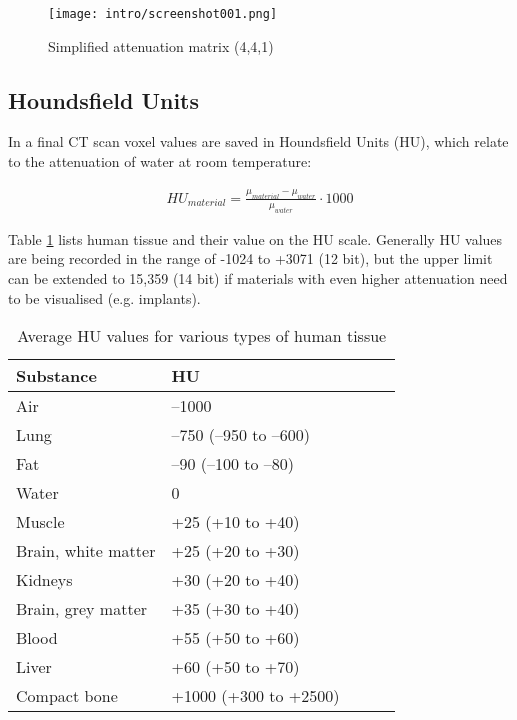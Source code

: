\begin{figure}[!htb]
	\centering
	\texttt{[image: intro/screenshot001.png]}
	\caption{Simplified attenuation matrix (4,4,1)}
	\label{fig:voxel_matrix}
\end{figure}

\subsection{Houndsfield Units}

In a final CT scan voxel values are saved in Houndsfield Units (HU), which relate to the attenuation of water at room temperature:

\begin{align}
HU_{material} = \frac{\mu_{material} - \mu_{water}}{\mu_{water}} \cdot 1000
\end{align}

Table \ref{tab:HU} lists human tissue and their value on the HU scale. Generally HU values are being recorded in the range of -1024 to +3071 (12 bit), but the upper limit can be extended to 15,359 (14 bit) if materials with even higher attenuation need to be visualised (e.g. implants).

\begin{table}[]
	\centering
	\caption{Average HU values for various types of human tissue}
	\label{tab:HU}
	\begin{tabular}{@{}lllll@{}}
		\toprule
		Substance           & HU                    &  &  &  \\ \midrule
		Air                 & –1000                 &  &  &  \\
		Lung                & –750 (–950 to –600)   &  &  &  \\
		Fat                 & –90 (–100 to –80)     &  &  &  \\
		Water               & 0                     &  &  &  \\
		Muscle              & +25 (+10 to +40)      &  &  &  \\
		Brain, white matter & +25 (+20 to +30)      &  &  &  \\
		Kidneys             & +30 (+20 to +40)      &  &  &  \\
		Brain, grey matter  & +35 (+30 to +40)      &  &  &  \\
		Blood               & +55 (+50 to +60)      &  &  &  \\
		Liver               & +60 (+50 to +70)      &  &  &  \\
		Compact bone        & +1000 (+300 to +2500) &  &  &  \\ \bottomrule
	\end{tabular}
\end{table}

